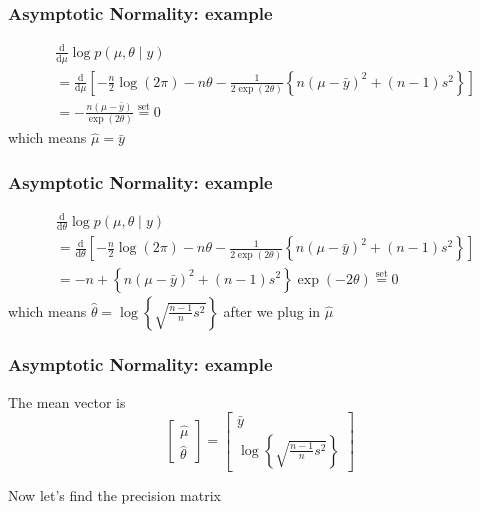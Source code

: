\documentclass{beamer}
\begin{document}
\begin{frame}
\frametitle{Asymptotic Normality: example}

\begin{align*}
&\frac{\text{d}}{\text{d} \mu} \log p(\mu, \theta \mid y) \\
&= \frac{\text{d}}{\text{d} \mu}\left[ -\frac{n}{2}\log(2\pi) -n\theta -\frac{1}{2 \exp(2\theta) } \left\{ n(\mu - \bar{y})^2 + (n-1)s^2 \right\} \right] \\
&=  -\frac{n(\mu - \bar{y})}{ \exp(2\theta) }  \overset{\text{set}}{=} 0 
\end{align*}
which means $\hat{\mu} = \bar{y}$

\end{frame}

\begin{frame}
\frametitle{Asymptotic Normality: example}

\begin{align*}
&\frac{\text{d}}{\text{d} \theta} \log p(\mu, \theta \mid y) \\
&= \frac{\text{d}}{\text{d} \theta }\left[ -\frac{n}{2}\log(2\pi) -n\theta -\frac{1}{2 \exp(2\theta) } \left\{ n(\mu - \bar{y})^2 + (n-1)s^2 \right\} \right] \\
&=  -n + \left\{ n(\mu - \bar{y})^2 + (n-1)s^2 \right\} \exp(-2\theta) \overset{\text{set}}{=} 0 
\end{align*}
which means $\hat{\theta} = \log \left\{ \sqrt{ \frac{n-1}{n}s^2}  \right\}$ after we plug in $\hat{\mu}$

\end{frame}

\begin{frame}
\frametitle{Asymptotic Normality: example}

The mean vector is
$$
\left[\begin{array}{c}
\hat{\mu} \\
\hat{\theta}
\end{array}\right]
= 
\left[\begin{array}{c}
\bar{y}\\
\log \left\{ \sqrt{ \frac{n-1}{n}s^2}  \right\}
\end{array}\right]
$$

Now let's find the precision matrix

\end{frame}
\end{document}
